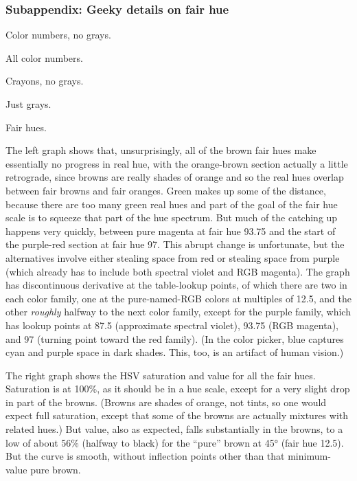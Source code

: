 \subsubsection{\texorpdfstring{\hfill\break
Subappendix: Geeky details on fair
hue}{ Subappendix: Geeky details on fair hue}}\label{subappendix-geeky-details-on-fair-hue}

Color numbers, no grays.

All color numbers.

Crayons, no grays.

Just grays.

Fair hues.

The left graph shows that, unsurprisingly, all of the brown fair hues
make essentially no progress in real hue, with the orange-brown section
actually a little retrograde, since browns are really shades of orange
and so the real hues overlap between fair browns and fair oranges. Green
makes up some of the distance, because there are too many green real
hues and part of the goal of the fair hue scale is to squeeze that part
of the hue spectrum. But much of the catching up happens very quickly,
between pure magenta at fair hue 93.75 and the start of the purple-red
section at fair hue 97. This abrupt change is unfortunate, but the
alternatives involve either stealing space from red or stealing space
from purple (which already has to include both spectral violet and RGB
magenta). The graph has discontinuous derivative at the table-lookup
points, of which there are two in each color family, one at the
pure-named-RGB colors at multiples of 12.5, and the other \emph{roughly}
halfway to the next color family, except for the purple family, which
has lookup points at 87.5 (approximate spectral violet), 93.75 (RGB
magenta), and 97 (turning point toward the red family). (In the color
picker, blue captures cyan and purple space in dark shades. This, too,
is an artifact of human vision.)

The right graph shows the HSV saturation and value for all the fair
hues. Saturation is at 100\%, as it should be in a hue scale, except for
a very slight drop in part of the browns. (Browns are shades of orange,
not tints, so one would expect full saturation, except that some of the
browns are actually mixtures with related hues.) But value, also as
expected, falls substantially in the browns, to a low of about 56\%
(halfway to black) for the ``pure'' brown at 45° (fair hue 12.5). But
the curve is smooth, without inflection points other than that
minimum-value pure brown.

